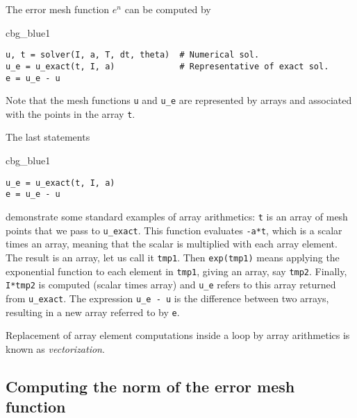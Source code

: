 \documentclass[graybox,sectrefs,envcountresetchap,open=right,final]{svmonodo}
\newenvironment{_cod_tight}[1]{
   \def\FrameCommand{\colorbox{#1}}
   \FrameRule0.6pt\MakeFramed {\FrameRestore}\vskip3mm}
   {\vskip0mm\endMakeFramed}
\newenvironment{cod}[1]{
\bgroup\rmfamily
\fboxsep=0mm\relax
\begin{_cod_tight}{#1}
\list{}{\parsep=-2mm\parskip=0mm\topsep=0pt\leftmargin=2mm
\rightmargin=2\leftmargin\leftmargin=4pt\relax}
\item\relax}
{\endlist\end{_cod_tight}\egroup}
\newenvironment{notice_mdfboxadmon}[1][]{
\begin{notice_mdfboxmdframed}[frametitle=#1]
}
{
\end{notice_mdfboxmdframed}
}
\begin{document}
The error mesh function $e^n$ can be computed by

\begin{cod}{cbg_blue1}\begin{Verbatim}[numbers=none,fontsize=\fontsize{9pt}{9pt},baselinestretch=0.95,xleftmargin=2mm]
u, t = solver(I, a, T, dt, theta)  # Numerical sol.
u_e = u_exact(t, I, a)             # Representative of exact sol.
e = u_e - u
\end{Verbatim}
\end{cod}
\noindent
Note that the mesh functions \texttt{u} and \Verb!u_e! are represented by arrays
and associated with the points in the array \texttt{t}.

  


\begin{notice_mdfboxadmon}
The last statements

\begin{cod}{cbg_blue1}\begin{Verbatim}[numbers=none,fontsize=\fontsize{9pt}{9pt},baselinestretch=0.95,xleftmargin=2mm]
u_e = u_exact(t, I, a)
e = u_e - u
\end{Verbatim}
\end{cod}
\noindent
demonstrate some standard examples of array arithmetics: \texttt{t} is an
array of mesh points that we pass to \Verb!u_exact!. This function
evaluates \texttt{-a*t}, which is a scalar times an array, meaning that
the scalar is multiplied with each array element.
The result is an array, let us call it \texttt{tmp1}. Then
\texttt{exp(tmp1)} means applying the exponential function to each element in
\texttt{tmp1}, giving an array, say \texttt{tmp2}. Finally, \texttt{I*tmp2} is computed
(scalar times array) and \Verb!u_e! refers to this array returned from
\Verb!u_exact!. The expression \Verb!u_e - u! is the difference between
two arrays, resulting in a new array referred to by \texttt{e}.

Replacement of array element computations inside a loop by array
arithmetics is known as \emph{vectorization}.
\end{notice_mdfboxadmon}



\subsection{Computing the norm of the error mesh function}
\label{decay:computing:error:norm}
\end{document}
